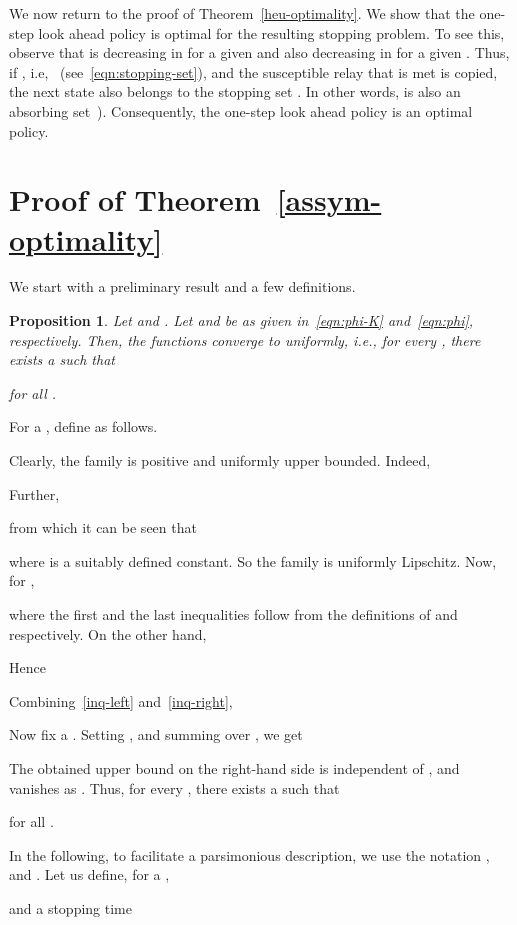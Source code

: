 \documentclass[10pt,journal,letterpaper]{IEEEtran}
\newtheorem{proposition}{Proposition}[section]
\begin{document}
We now return to the proof of Theorem~\ref{heu-optimality}.
We show that the one-step look ahead policy is optimal for the resulting
stopping problem. To see this, observe that  is decreasing in  for
a given  and also decreasing in  for a given . Thus,
if , i.e, ~(see~\eqref{eqn:stopping-set}), and the
susceptible relay that is met is copied, the next state  also belongs to the
stopping set . In  other words,   is also an
absorbing set~\cite[Section~3.4]{stochctrl.bertsekas07dpoc-vol2}).
Consequently, the one-step look ahead policy is an optimal policy.


\section{Proof of Theorem~\ref{assym-optimality}}
\label{proof-assym-optimality}
We start with a preliminary result and a few definitions.
\begin{proposition}
\label{prop-uni-conv} Let  and . Let 
and  be as given in~\eqref{eqn:phi-K} and~\eqref{eqn:phi},
respectively. Then, the functions  converge to
 uniformly, i.e., for every , there exists a
 such that

for all .
\end{proposition}
\begin{IEEEproof}
For a , define  as follows.

Clearly, the family  is positive and uniformly upper
bounded. Indeed,

Further,

from which it can be seen that

where  is a suitably defined constant. So the family
 is uniformly Lipschitz. Now, for ,

where the first and the last inequalities follow from the
definitions of  and  respectively. On the other
hand,

Hence

Combining~\eqref{inq-left} and~\eqref{inq-right},

Now fix a . Setting , and summing over
, we get

The obtained upper bound on the right-hand side is independent of
, and vanishes as . Thus, for every , there exists a
 such that

for all .
\end{IEEEproof}

In the following, to facilitate a parsimonious description, we use
the notation ,  and
. Let us define, for
a ,

and a stopping time
\end{document}
